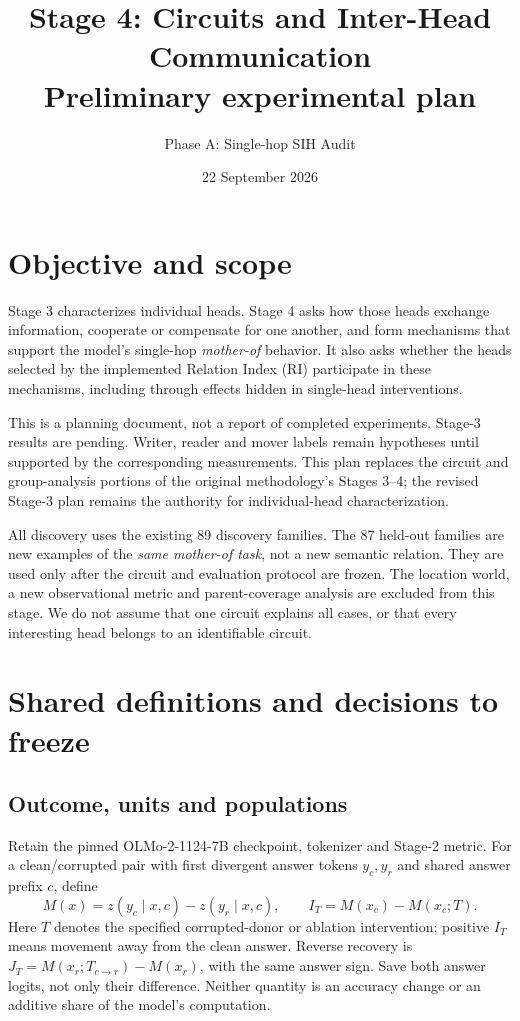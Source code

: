 \documentclass[11pt,a4paper]{article}
\title{Stage 4: Circuits and Inter-Head Communication\\\large Preliminary experimental plan}
\author{Phase A: Single-hop SIH Audit}
\date{22 September 2026}
\begin{document}
\maketitle

\section{Objective and scope}
Stage 3 characterizes individual heads. Stage 4 asks how those heads exchange
information, cooperate or compensate for one another, and form mechanisms that
support the model's single-hop \emph{mother-of} behavior. It also asks whether
the heads selected by the implemented Relation Index (RI) participate in these
mechanisms, including through effects hidden in single-head interventions.

This is a planning document, not a report of completed experiments. Stage-3
results are pending. Writer, reader and mover labels remain hypotheses until
supported by the corresponding measurements. This plan replaces the circuit
and group-analysis portions of the original methodology's Stages 3--4; the
revised Stage-3 plan remains the authority for individual-head characterization.

All discovery uses the existing 89 discovery families. The 87 held-out families
are new examples of the \emph{same mother-of task}, not a new semantic relation.
They are used only after the circuit and evaluation protocol are frozen.
The location world, a new observational metric and parent-coverage analysis are
excluded from this stage. We do not assume that one circuit explains all cases,
or that every interesting head belongs to an identifiable circuit.

\section{Shared definitions and decisions to freeze}
\subsection{Outcome, units and populations}
Retain the pinned OLMo-2-1124-7B checkpoint, tokenizer and Stage-2 metric.
For a clean/corrupted pair with first divergent answer tokens $y_c,y_r$ and
shared answer prefix $c$, define
\[
 M(x)=z(y_c\mid x,c)-z(y_r\mid x,c),\qquad
 I_T=M(x_c)-M(x_c;T).
\]
Here $T$ denotes the specified corrupted-donor or ablation intervention;
positive $I_T$ means movement away from the clean answer. Reverse recovery is
$J_T=M(x_r;T_{c\to r})-M(x_r)$, with the same answer sign.
Save both answer logits, not only their difference. Neither quantity is an
accuracy change or an additive share of the model's computation.
\end{document}
